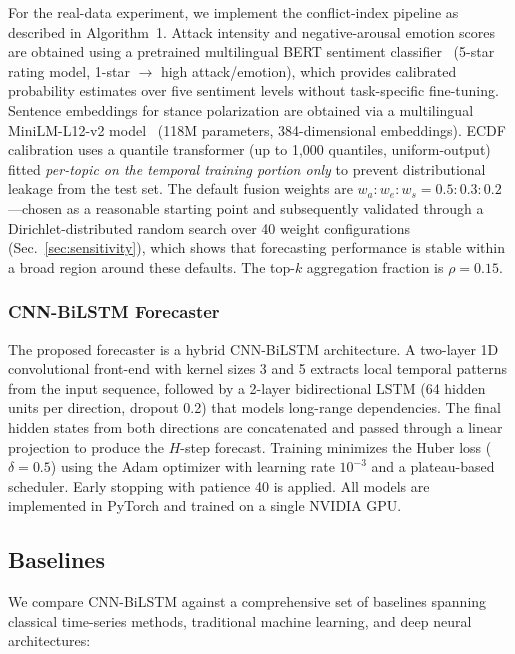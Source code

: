 \documentclass[journal]{IEEEtran}
\begin{document}
For the real-data experiment, we implement the conflict-index pipeline as described in Algorithm~1. Attack intensity and negative-arousal emotion scores are obtained using a pretrained multilingual BERT sentiment classifier~\cite{bert-multilingual-sentiment} (5-star rating model, 1-star $\rightarrow$ high attack/emotion), which provides calibrated probability estimates over five sentiment levels without task-specific fine-tuning. Sentence embeddings for stance polarization are obtained via a multilingual MiniLM-L12-v2 model~\cite{wang2020minilm} (118M parameters, 384-dimensional embeddings). ECDF calibration uses a quantile transformer (up to 1,000 quantiles, uniform-output) fitted \emph{per-topic on the temporal training portion only} to prevent distributional leakage from the test set. The default fusion weights are $w_a:w_e:w_s = 0.5:0.3:0.2$---chosen as a reasonable starting point and subsequently validated through a Dirichlet-distributed random search over 40 weight configurations (Sec.~\ref{sec:sensitivity}), which shows that forecasting performance is stable within a broad region around these defaults. The top-$k$ aggregation fraction is $\rho=0.15$.

\subsubsection{CNN-BiLSTM Forecaster}

The proposed forecaster is a hybrid CNN-BiLSTM architecture. A two-layer 1D convolutional front-end with kernel sizes 3 and 5 extracts local temporal patterns from the input sequence, followed by a 2-layer bidirectional LSTM (64 hidden units per direction, dropout 0.2) that models long-range dependencies. The final hidden states from both directions are concatenated and passed through a linear projection to produce the $H$-step forecast. Training minimizes the Huber loss ($\delta=0.5$) using the Adam optimizer with learning rate $10^{-3}$ and a plateau-based scheduler. Early stopping with patience 40 is applied. All models are implemented in PyTorch and trained on a single NVIDIA GPU.

\subsection{Baselines}

We compare CNN-BiLSTM against a comprehensive set of baselines spanning classical time-series methods, traditional machine learning, and deep neural architectures:
\end{document}
